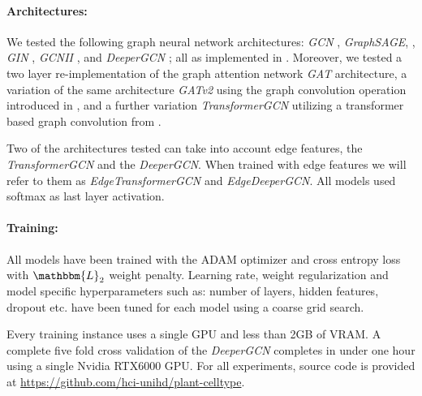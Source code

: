 \documentclass[10pt,twocolumn,letterpaper]{article}
\begin{document}
\paragraph{Architectures:} We tested the following graph neural network architectures: \textit{GCN} \cite{kipf2016semi}, \textit{GraphSAGE}, \cite{hamilton2017inductive}, \textit{GIN} \cite{xu2018powerful}, \textit{GCNII} \cite{chen2020simple}, and \textit{DeeperGCN} \cite{li2019deepgcns, li2020deepergcn}; all as implemented in \cite{Fey2019}. Moreover, we tested a two layer re-implementation of the graph attention network \textit{GAT} \cite{velickovic2018graph} architecture, a variation of the same architecture \textit{GATv2} using the graph convolution operation introduced in \cite{brody2021attentive}, and a further variation \textit{TransformerGCN} utilizing a transformer \cite{vaswani2017attention} based graph convolution from \cite{shi2020masked}. 

Two of the architectures tested can take into account edge features, the \textit{TransformerGCN} and the \textit{DeeperGCN}. When trained with edge features we will refer to them as \textit{EdgeTransformerGCN} and \textit{EdgeDeeperGCN}.
All models used softmax as last layer activation. 

\paragraph{Training:} All models have been trained with the ADAM optimizer \cite{kingma2015adam} and cross entropy loss with $\mathbbm{L}_2$ weight penalty. Learning rate, weight regularization and model specific hyperparameters such as: number of layers, hidden features, dropout etc. have been tuned for each model using a coarse grid search.

Every training instance uses a single GPU and less than 2GB of VRAM. A complete five fold cross validation of the \textit{DeeperGCN} completes in under one hour using a single Nvidia RTX6000 GPU. For all experiments, source code is provided at \url{https://github.com/hci-unihd/plant-celltype}.
\end{document}
